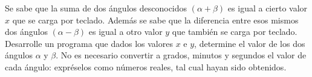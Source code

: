 Se sabe que la suma de dos ángulos desconocidos $(\alpha + \beta)$ es igual a cierto valor $x$ que se carga por teclado. Además se sabe que la diferencia entre esos mismos dos ángulos $(\alpha - \beta)$ es igual a otro valor $y$ que también se carga por teclado. Desarrolle un programa que dados los valores $x$ e $y$, determine el valor de los dos ángulos $\alpha$ y $\beta$. No es necesario convertir a grados, minutos y segundos el valor de cada ángulo: expréselos como números reales, tal cual hayan sido obtenidos.

